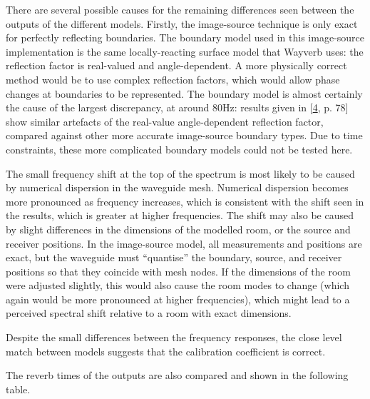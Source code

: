 \documentclass[]{scrreprt}
\begin{document}
There are several possible causes for the remaining differences seen
between the outputs of the different models. Firstly, the image-source
technique is only exact for perfectly reflecting boundaries. The
boundary model used in this image-source implementation is the same
locally-reacting surface model that Wayverb uses: the reflection factor
is real-valued and angle-dependent. A more physically correct method
would be to use complex reflection factors, which would allow phase
changes at boundaries to be represented. The boundary model is almost
certainly the cause of the largest discrepancy, at around 80Hz: results
given in {[}\protect\hyperlink{ref-aretzux5fcombinedux5f2009}{4}, p.
78{]} show similar artefacts of the real-value angle-dependent
reflection factor, compared against other more accurate image-source
boundary types. Due to time constraints, these more complicated boundary
models could not be tested here.

The small frequency shift at the top of the spectrum is most likely to
be caused by numerical dispersion in the waveguide mesh. Numerical
dispersion becomes more pronounced as frequency increases, which is
consistent with the shift seen in the results, which is greater at
higher frequencies. The shift may also be caused by slight differences
in the dimensions of the modelled room, or the source and receiver
positions. In the image-source model, all measurements and positions are
exact, but the waveguide must ``quantise'' the boundary, source, and
receiver positions so that they coincide with mesh nodes. If the
dimensions of the room were adjusted slightly, this would also cause the
room modes to change (which again would be more pronounced at higher
frequencies), which might lead to a perceived spectral shift relative to
a room with exact dimensions.

Despite the small differences between the frequency responses, the close
level match between models suggests that the calibration coefficient is
correct.

The reverb times of the outputs are also compared and shown in the
following table.
\end{document}
